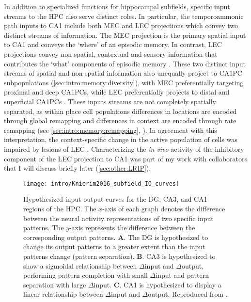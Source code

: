 In addition to specialized functions for hippocampal subfields, specific input streams to the \ac{HPC} also serve distinct roles.
In particular, the temporoammonic path inputs to CA1 include both \ac{MEC} and \ac{LEC} projections which convey two distinct streams of information.
The \ac{MEC} projection is the primary spatial input to CA1 and conveys the `where' of an episodic memory.
In contrast, \ac{LEC} projections convey non-spatial, contextual and sensory information that contributes the `what' components of episodic memory \citep{Hargreaves2005, Dickerson2010, Eichenbaum2012}.
These two distinct input streams of spatial and non-spatial information also unequally project to CA1PC subpopulations (\autoref{sec:intro:memory:diversity}), with \ac{MEC} preferentially targeting proximal and deep \acp{CA1PC}, while \ac{LEC} preferentially projects to distal and superficial \acp{CA1PC} \citep{Masurkar2017}.
These inputs streams are not completely spatially separated, as within place cell populations differences in locations are encoded through global remapping and differences in context are encoded through rate remapping (see \autoref{sec:intro:memory:remapping}, \citealp{Leutgeb2005a}).
In agreement with this interpretation, the context-specific change in the active population of cells was impaired by lesions of \ac{LEC} \citep{Lu2013}.
Characterizing the \emph{in vivo} activity of the inhibitory component of the \ac{LEC} projection to CA1 was part of my work with collaborators that I will discuss briefly later (\autoref{sec:other:LRIP}).

\begin{figure}
	\centering
	\texttt{[image: intro/Knierim2016\_subfield\_IO\_curves]}
	\caption[Hypothesized input-output curves for the DG, CA3, and CA1 regions of the \acl{HPC}]{Hypothesized input-output curves for the DG, CA3, and CA1 regions of the \acl{HPC}. The $x$-axis of each graph denotes the difference between the neural activity representations of two specific input patterns. The $y$-axis represents the difference between the corresponding output patterns.
	\textbf{A}. The DG is hypothesized to change its output patterns to a greater extent than the input patterns change (pattern separation).
	\textbf{B}. CA3 is hypothesized to show a sigmoidal relationship between $\Delta$input and $\Delta$output, performing pattern completion with small $\Delta$input and pattern separation with large $\Delta$input.
	\textbf{C}. CA1 is hypothesized to display a linear relationship between $\Delta$input and $\Delta$output.
	Reproduced from \citet{Knierim2016}.}
	\label{fig:intro:memory:subfield_IO}
\end{figure}

